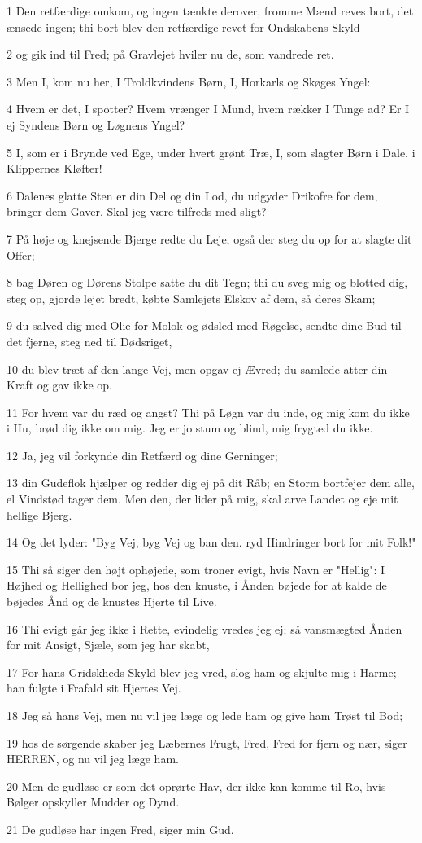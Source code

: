 \par 1 Den retfærdige omkom, og ingen tænkte derover, fromme Mænd reves bort, det ænsede ingen; thi bort blev den retfærdige revet for Ondskabens Skyld
\par 2 og gik ind til Fred; på Gravlejet hviler nu de, som vandrede ret.
\par 3 Men I, kom nu her, I Troldkvindens Børn, I, Horkarls og Skøges Yngel:
\par 4 Hvem er det, I spotter? Hvem vrænger I Mund, hvem rækker I Tunge ad? Er I ej Syndens Børn og Løgnens Yngel?
\par 5 I, som er i Brynde ved Ege, under hvert grønt Træ, I, som slagter Børn i Dale. i Klippernes Kløfter!
\par 6 Dalenes glatte Sten er din Del og din Lod, du udgyder Drikofre for dem, bringer dem Gaver. Skal jeg være tilfreds med sligt?
\par 7 På høje og knejsende Bjerge redte du Leje, også der steg du op for at slagte dit Offer;
\par 8 bag Døren og Dørens Stolpe satte du dit Tegn; thi du sveg mig og blotted dig, steg op, gjorde lejet bredt, købte Samlejets Elskov af dem, så deres Skam;
\par 9 du salved dig med Olie for Molok og ødsled med Røgelse, sendte dine Bud til det fjerne, steg ned til Dødsriget,
\par 10 du blev træt af den lange Vej, men opgav ej Ævred; du samlede atter din Kraft og gav ikke op.
\par 11 For hvem var du ræd og angst? Thi på Løgn var du inde, og mig kom du ikke i Hu, brød dig ikke om mig. Jeg er jo stum og blind, mig frygted du ikke.
\par 12 Ja, jeg vil forkynde din Retfærd og dine Gerninger;
\par 13 din Gudeflok hjælper og redder dig ej på dit Råb; en Storm bortfejer dem alle, el Vindstød tager dem. Men den, der lider på mig, skal arve Landet og eje mit hellige Bjerg.
\par 14 Og det lyder: "Byg Vej, byg Vej og ban den. ryd Hindringer bort for mit Folk!"
\par 15 Thi så siger den højt ophøjede, som troner evigt, hvis Navn er "Hellig": I Højhed og Hellighed bor jeg, hos den knuste, i Ånden bøjede for at kalde de bøjedes Ånd og de knustes Hjerte til Live.
\par 16 Thi evigt går jeg ikke i Rette, evindelig vredes jeg ej; så vansmægted Ånden for mit Ansigt, Sjæle, som jeg har skabt,
\par 17 For hans Gridskheds Skyld blev jeg vred, slog ham og skjulte mig i Harme; han fulgte i Frafald sit Hjertes Vej.
\par 18 Jeg så hans Vej, men nu vil jeg læge og lede ham og give ham Trøst til Bod;
\par 19 hos de sørgende skaber jeg Læbernes Frugt, Fred, Fred for fjern og nær, siger HERREN, og nu vil jeg læge ham.
\par 20 Men de gudløse er som det oprørte Hav, der ikke kan komme til Ro, hvis Bølger opskyller Mudder og Dynd.
\par 21 De gudløse har ingen Fred, siger min Gud.

